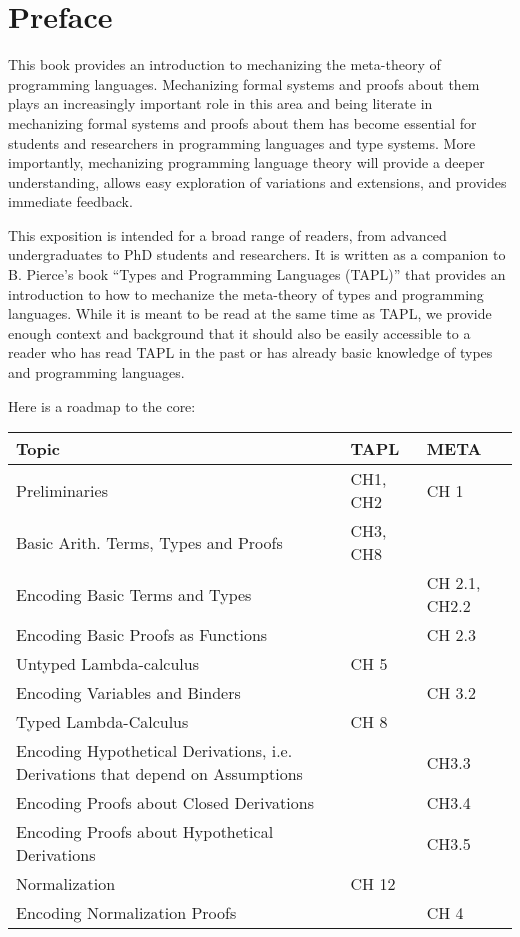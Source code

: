 \chapter*{Preface}
This book provides an introduction to mechanizing the meta-theory of programming languages. Mechanizing formal systems and proofs about them plays an increasingly important role in this area and being literate in mechanizing formal systems and proofs about them  has become essential for students and researchers in programming languages and type systems. More importantly, mechanizing programming language theory will provide a deeper understanding, allows easy  exploration of variations and extensions, and provides immediate feedback.

This exposition is intended for a broad range of readers, from advanced undergraduates to PhD students and researchers.  It is written as a companion to B. Pierce's book ``Types and Programming Languages (TAPL)'' that provides an introduction to how to mechanize the meta-theory of types and programming languages. While it is meant to be read  at the same time as TAPL, we provide enough context and background that it should also be easily accessible to a reader who has read TAPL in the past or has already basic knowledge of types and programming languages. 

Here is a roadmap to the core:

\begin{center}
\begin{tabular}{p{9cm}|p{2.25cm}|p{2.75cm}}
 Topic & TAPL & META \\
\hline  
Preliminaries & CH1, CH2 & CH 1\\
Basic Arith. Terms, Types and Proofs & CH3, CH8 &  \\
\hline  
Encoding Basic Terms and Types & & CH 2.1, CH2.2 \\
Encoding Basic Proofs as Functions & & CH 2.3 \\
\hline  
Untyped Lambda-calculus & CH 5  & \\
Encoding Variables and Binders & & CH 3.2 \\
\hline  
Typed Lambda-Calculus & CH 8  & \\
Encoding Hypothetical Derivations, i.e. Derivations that depend on Assumptions & & CH3.3\\
Encoding Proofs about Closed Derivations & & CH3.4 \\
Encoding Proofs about Hypothetical Derivations & & CH3.5 \\
\hline
Normalization & CH 12 & \\
Encoding Normalization Proofs & & CH 4 \\
\end{tabular}
\end{center}

